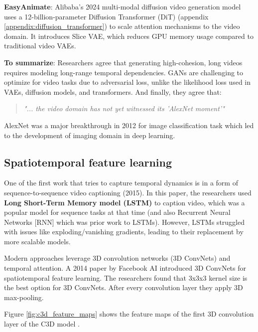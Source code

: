 \textbf{EasyAnimate}: Alibaba's 2024 multi-modal diffusion video generation model \cite{easyanimate} uses a 12-billion-parameter Diffusion Transformer (DiT) (appendix \ref{appendix:diffusion_transformer}) to scale attention mechanisms to the video domain. It introduces Slice VAE, which reduces GPU memory usage compared to traditional video VAEs.

\textbf{To summarize}: Researchers agree that generating high-cohesion, long videos requires modeling long-range temporal dependencies. GANs are challenging to optimize for video tasks due to adversarial loss, unlike the likelihood loss used in VAEs, diffusion models, and transformers. And finally, they agree that:

\begin{quote}
    \textit{"... the video domain has not yet witnessed its 'AlexNet moment'"} \cite{tran2018closer}
\end{quote}

AlexNet \cite{alexnet} was a major breakthrough in 2012 for image classification task which led to the development of imaging domain in deep learning.










\subsection{Spatiotemporal feature learning}

One of the first work that tries to capture temporal dynamics is in a form of sequence-to-sequence video captioning \cite{venugopalan2015sequence} (2015). In this paper, the researchers used \textbf{Long Short-Term Memory model (LSTM)} to caption video, which was a popular model for sequence tasks at that time (and also Recurrent Neural Networks [RNN] which was prior work to LSTMs). However, LSTMs struggled with issues like exploding/vanishing gradients, leading to their replacement by more scalable models.

Modern approaches leverage 3D convolution networks (3D ConvNets) and temporal attention. A 2014 paper \cite{tran2015learning} by Facebook AI introduced 3D ConvNets for spatiotemporal feature learning. The researchers found that 3x3x3 kernel size is the best option for 3D ConvNets. After every convolution layer they apply 3D max-pooling.

Figure \ref{fig:c3d_feature_maps} shows the feature maps of the first 3D convolution layer of the C3D model \cite{tran2015learning}.

